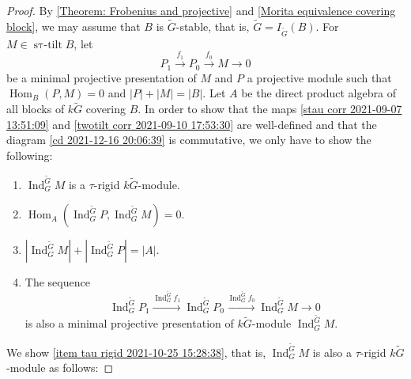 \documentclass[pdftex,a4paper]{article}
\numberwithin{equation}{subsection}
\theoremstyle{definition}
\newcommand{\Hom}{\operatorname{Hom}\nolimits}
\newcommand{\induc}{{\operatorname{Ind}\nolimits}}
\newcommand{\stautilt}{\operatorname{\mathrm{s\tau-tilt}}}
\newcommand{\inertiagp}{I}
\begin{document}
\begin{proof}
	By \cref{Theorem: Frobenius and projective} and \cref{Morita equivalence covering block}, we may assume that \(B\) is \(\tilde{G}\)-stable, that is, \(\tilde{G}=\inertiagp_{\tilde{G}}(B)\).
	For \(M \in \stautilt B\), let
	\begin{equation}
		P_1\xrightarrow{f_1}P_0\xrightarrow{f_0}M\rightarrow 0
	\end{equation}
	be a minimal projective presentation of \(M\) and \(P\) a projective module such that \(\Hom_{B}(P,M)=0\) and \(|P|+|M|=|B|\).
	Let \(A\) be the direct product algebra of all blocks of \(k\tilde{G}\) covering \(B\).
	In order to show that the maps \eqref{stau corr 2021-09-07 13:51:09} and \eqref{twotilt corr 2021-09-10 17:53:30} are well-defined and that the diagram \eqref{cd 2021-12-16 20:06:39} is commutative, we only have to show the following:
	\begin{enumerate}
		\item \(\induc_G^{\tilde{G}} M\) is a \(\tau\)-rigid \(k\tilde{G}\)-module.\label{item tau rigid 2021-10-25 15:28:38}
		\item \(\Hom_A(\induc_G^{\tilde{G}} P,\induc_G^{\tilde{G}} M)=0\).\label{item pair 2021-10-25 15:35:12}
		\item \(|\induc_G^{\tilde{G}} M|+|\induc_G^{\tilde{G}} P|=|A|\).\label{item count pair 2021-10-25 15:45:36}
		\item The sequence
		      \begin{equation}
			      \induc_G^{\tilde{G}}P_1\xrightarrow{\induc_G^{\tilde{G}}f_1}\induc_G^{\tilde{G}}P_0\xrightarrow{\induc_G^{\tilde{G}}f_0}\induc_G^{\tilde{G}}M\rightarrow 0
		      \end{equation}
		      is also a minimal projective presentation of \(k\tilde{G}\)-module \(\induc_G^{\tilde{G}}M\).\label{item minimal presentation 2021-10-25 16:02:34}
	\end{enumerate}
	We show \ref{item tau rigid 2021-10-25 15:28:38}, that is, \(\induc_G^{\tilde{G}} M\) is also a \(\tau\)-rigid \(k\tilde{G}\)-module as follows:


\end{proof}
\end{document}
